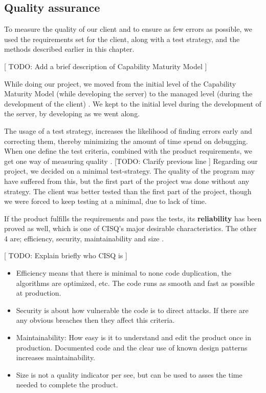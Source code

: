 \subsection{Quality assurance}
To measure the quality of our client and to ensure as few errors as possible, we used the requirements set for the client, along with a test strategy, and the methods described earlier in this chapter.

[ TODO: Add a brief description of Capability Maturity Model ]

While doing our project, we moved from the initial level of the Capability Maturity Model (while developing the server) to the managed level (during the development of the client) \cite[p. ?]{?}. We kept to the initial level during the development of the server, by developing as we went along.

The usage of a test strategy, increases the likelihood of finding errors early and correcting them, thereby minimizing the amount of time spend on debugging. When one define the test criteria, combined with the product requirements, we get one way of measuring quality \cite[p. ?]{?}. [TODO: Clarify previous line ]
Regarding our project, we decided on a minimal test-strategy. The quality of the program may have suffered from this, but the first part of the project was done without any strategy. The client was better tested than the first part of the project, though we were forced to keep testing at a minimal, due to lack of time.

If the product fulfills the requirements and pass the tests, its \textbf{reliability} has been proved as well, which is one of CISQ's  major desirable characteristics. The other 4 are; efficiency, security, maintainability and size \cite[p. ?]{?}.

[ TODO: Explain briefly who CISQ is ]

\begin{itemize}
	\item Efficiency means that there is minimal to none code duplication, the algorithms are optimized, etc. The code runs as smooth and fast as possible at production.
	\item Security is about how vulnerable the code is to direct attacks. If there are any obvious breaches then they affect this criteria.
	\item Maintainability: How easy is it to understand and edit the product once in production. Documented code and the clear use of known design patterns increases maintainability. 
	\item Size is not a quality indicator per see, but can be used to asses the time needed to complete the product.
\end{itemize}

